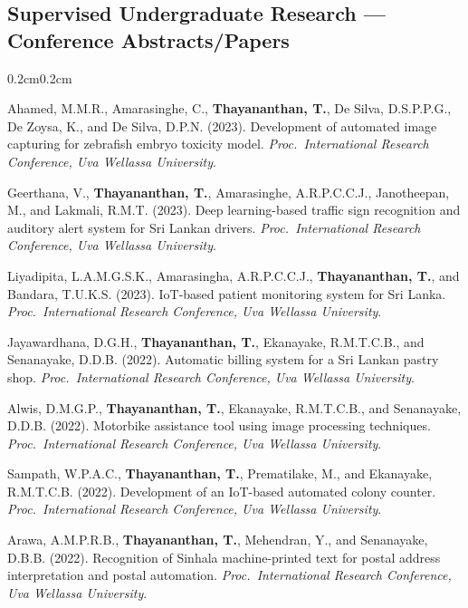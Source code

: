 \documentclass[10pt, letterpaper]{article}
\newcommand{\textbfr}[1]{\textbf{#1}}
\newenvironment{onecolentry}{%
    \begin{adjustwidth}{0.2cm}{0.2cm}
}{\end{adjustwidth}}
\newenvironment{pubsU}{%
  \begin{enumerate}[label={[U\arabic*]}, leftmargin=1.15cm, labelsep=0.2cm,
                    topsep=0.08cm, parsep=0.08cm, partopsep=0pt, itemsep=0pt]
}{\end{enumerate}}
\begin{document}
\subsection{Supervised Undergraduate Research --- Conference Abstracts/Papers}
\begin{onecolentry}
\begin{pubsU}
    \item Ahamed, M.M.R., Amarasinghe, C., \textbfr{Thayananthan, T.},
    De Silva, D.S.P.P.G., De Zoysa, K., and De Silva, D.P.N. (2023). Development of
    automated image capturing for zebrafish embryo toxicity model.
    \emph{Proc.\ International Research Conference, Uva Wellassa University}.

    \item Geerthana, V., \textbfr{Thayananthan, T.}, Amarasinghe, A.R.P.C.C.J.,
    Janotheepan, M., and Lakmali, R.M.T. (2023). Deep learning-based traffic sign
    recognition and auditory alert system for Sri Lankan drivers.
    \emph{Proc.\ International Research Conference, Uva Wellassa University}.

    \item Liyadipita, L.A.M.G.S.K., Amarasingha, A.R.P.C.C.J.,
    \textbfr{Thayananthan, T.}, and Bandara, T.U.K.S. (2023). IoT-based patient
    monitoring system for Sri Lanka. \emph{Proc.\ International Research Conference,
    Uva Wellassa University}.

    \item Jayawardhana, D.G.H., \textbfr{Thayananthan, T.}, Ekanayake, R.M.T.C.B.,
    and Senanayake, D.D.B. (2022). Automatic billing system for a Sri Lankan pastry
    shop. \emph{Proc.\ International Research Conference, Uva Wellassa University}.

    \item Alwis, D.M.G.P., \textbfr{Thayananthan, T.}, Ekanayake, R.M.T.C.B., and
    Senanayake, D.D.B. (2022). Motorbike assistance tool using image processing
    techniques. \emph{Proc.\ International Research Conference, Uva Wellassa
    University}.

    \item Sampath, W.P.A.C., \textbfr{Thayananthan, T.}, Prematilake, M., and
    Ekanayake, R.M.T.C.B. (2022). Development of an IoT-based automated colony
    counter. \emph{Proc.\ International Research Conference, Uva Wellassa
    University}.

    \item Arawa, A.M.P.R.B., \textbfr{Thayananthan, T.}, Mehendran, Y., and
    Senanayake, D.B.B. (2022). Recognition of Sinhala machine-printed text for
    postal address interpretation and postal automation.
    \emph{Proc.\ International Research Conference, Uva Wellassa University}.


\end{pubsU}
\end{onecolentry}
\end{document}
